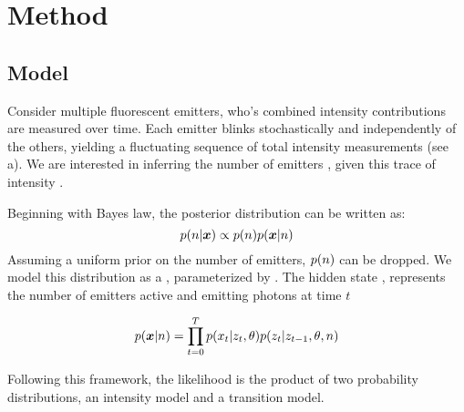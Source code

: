 \section{Method}


\subsection{Model}
Consider multiple fluorescent emitters, who's combined intensity contributions are measured over time.
  Each emitter blinks stochastically and independently of the others, 
  yielding a fluctuating sequence of total intensity measurements (see a).
  We are interested in inferring the number of emitters \n, given this trace of intensity \trace.
  
  Beginning with Bayes law, the posterior distribution can be written as:
  \begin{equation*}
    p(n | \bm{x}) \propto p(n) p(\bm{x} | n)
  \end{equation*}
  Assuming a uniform prior on the number of emitters, $p(n)$ can be dropped.
  We model this distribution as a \hmm, parameterized by \parameters.
    The hidden state \z, represents the number of emitters active and emitting photons at time $t$
    
  \begin{equation}
    p(\bm{x}| n) = \prod_{t=0}^{T} p(x_{t} | z_{t}, \theta) p(z_{t} | z_{t-1}, \theta, n)
    \label{eq:method:HMM}
  \end{equation}

  Following this framework, the likelihood is the product of two probability distributions,
  an intensity model and a transition model.

